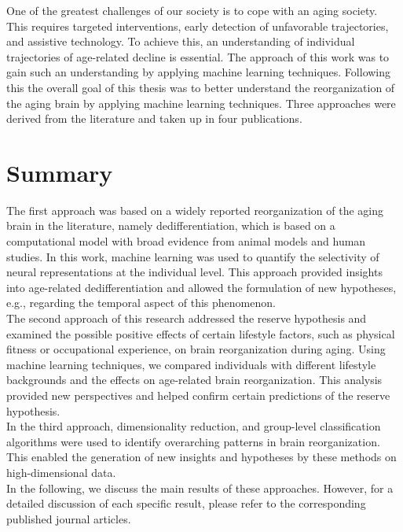 One of the greatest challenges of our society is to cope with an aging society. This requires targeted interventions, early detection of unfavorable trajectories, and assistive technology. To achieve this, an understanding of individual trajectories of age-related decline is essential. The approach of this work was to gain such an understanding by applying machine learning techniques. Following this the overall goal of this thesis was to better understand the reorganization of the aging brain by applying machine learning techniques. Three approaches were derived from the literature and taken up in four publications.\\

\section{Summary}
The first approach was based on a widely reported reorganization of the aging brain in the literature, namely dedifferentiation, which is based on a computational model with broad evidence from animal models and human studies. In this work, machine learning was used to quantify the selectivity of neural representations at the individual level. This approach provided insights into age-related dedifferentiation and allowed the formulation of new hypotheses, e.g., regarding the temporal aspect of this phenomenon.\\
The second approach of this research addressed the reserve hypothesis and examined the possible positive effects of certain lifestyle factors, such as physical fitness or occupational experience, on brain reorganization during aging. Using machine learning techniques, we compared individuals with different lifestyle backgrounds and the effects on age-related brain reorganization. This analysis provided new perspectives and helped confirm certain predictions of the reserve hypothesis.\\
In the third approach, dimensionality reduction, and group-level classification algorithms were used to identify overarching patterns in brain reorganization. This enabled the generation of new insights and hypotheses by these methods on high-dimensional data.\\
In the following, we discuss the main results of these approaches. However, for a detailed discussion of each specific result, please refer to the corresponding published journal articles.\\

